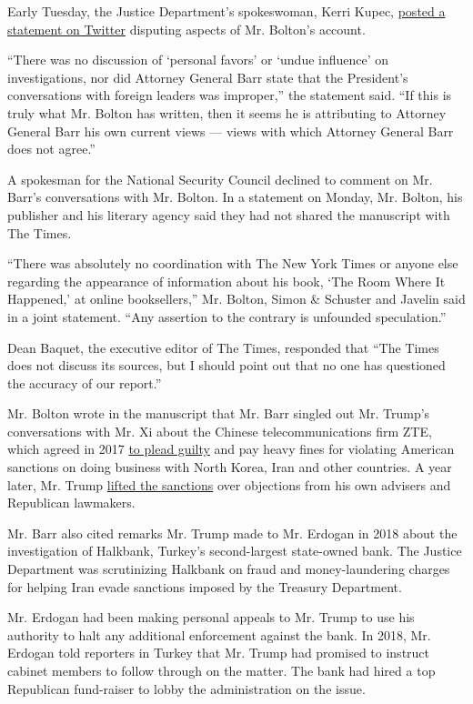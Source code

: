 Early Tuesday, the Justice Department's spokeswoman, Kerri Kupec,
\href{https://twitter.com/KerriKupecDOJ/status/1222024338469199873?s=20}{posted
a statement on Twitter} disputing aspects of Mr. Bolton's account.

``There was no discussion of `personal favors' or `undue influence' on
investigations, nor did Attorney General Barr state that the President's
conversations with foreign leaders was improper,'' the statement said.
``If this is truly what Mr. Bolton has written, then it seems he is
attributing to Attorney General Barr his own current views --- views
with which Attorney General Barr does not agree.''

A spokesman for the National Security Council declined to comment on Mr.
Barr's conversations with Mr. Bolton. In a statement on Monday, Mr.
Bolton, his publisher and his literary agency said they had not shared
the manuscript with The Times.

``There was absolutely no coordination with The New York Times or anyone
else regarding the appearance of information about his book, `The Room
Where It Happened,' at online booksellers,'' Mr. Bolton, Simon \&
Schuster and Javelin said in a joint statement. ``Any assertion to the
contrary is unfounded speculation.''

Dean Baquet, the executive editor of The Times, responded that ``The
Times does not discuss its sources, but I should point out that no one
has questioned the accuracy of our report.''

Mr. Bolton wrote in the manuscript that Mr. Barr singled out Mr. Trump's
conversations with Mr. Xi about the Chinese telecommunications firm ZTE,
which agreed in 2017
\href{https://www.justice.gov/opa/pr/zte-corporation-agrees-plead-guilty-and-pay-over-4304-million-violating-us-sanctions-sending}{to
plead guilty} and pay heavy fines for violating American sanctions on
doing business with North Korea, Iran and other countries. A year later,
Mr. Trump
\href{https://www.nytimes3xbfgragh.onion/2018/06/07/business/us-china-zte-deal.html}{lifted
the sanctions} over objections from his own advisers and Republican
lawmakers.

Mr. Barr also cited remarks Mr. Trump made to Mr. Erdogan in 2018 about
the investigation of Halkbank, Turkey's second-largest state-owned bank.
The Justice Department was scrutinizing Halkbank on fraud and
money-laundering charges for helping Iran evade sanctions imposed by the
Treasury Department.

Mr. Erdogan had been making personal appeals to Mr. Trump to use his
authority to halt any additional enforcement against the bank. In 2018,
Mr. Erdogan told reporters in Turkey that Mr. Trump had promised to
instruct cabinet members to follow through on the matter. The bank had
hired a top Republican fund-raiser to lobby the administration on the
issue.

